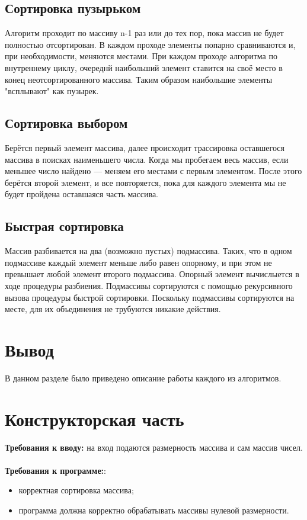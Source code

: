 \documentclass[12pt,a4paper]{article}
\numberwithin{equation}{section}
\begin{document}
\subsection{Сортировка пузырьком}
\qquad Алгоритм проходит по массиву {n-1} раз или до тех пор, пока массив не будет полностью отсортирован. 
В каждом проходе элементы попарно сравниваются и, при необходимости, меняются местами.
При каждом проходе алгоритма по внутреннему циклу, очереднй наибольший элемент ставится на своё место в конец неотсортированного массива. 
Таким образом наибольшие элементы "всплывают" как пузырек. 

\subsection{Сортировка выбором}
\qquad Берётся первый элемент массива, далее происходит трассировка оставшегося массива в поисках наименьшего числа. Когда мы пробегаем весь массив, если меньшее число найдено — меняем его местами с первым элементом. После этого берётся второй элемент, и все повторяется, пока для каждого элемента мы не будет пройдена оставшаяся часть массива.

\subsection {Быстрая сортировка}
\qquad Массив разбивается на два (возможно пустых) подмассива. Таких, что в одном подмассиве каждый элемент меньше либо равен опорному, 
и при этом не превышает любой элемент второго подмассива. Опорный элемент вычислыется в ходе процедуры разбиения. 
Подмассивы сортируются с помощью рекурсивного вызова процедуры быстрой сортировки. 
Поскольку подмассивы сортируются на месте, для их объединения не трубуются никакие действия.

\section*{Вывод}
\qquad В данном разделе было приведено описание работы каждого из алгоритмов.
\clearpage

\section{Конструкторская часть}
\textbf{Требования к вводу:} на вход подаются размерность массива и сам массив чисел.\\\\
\textbf{Требования к программе:}:\\
\begin{itemize}
\item корректная сортировка массива;
\item программа должна корректно обрабатывать массивы нулевой размерности.
\end{itemize}
\clearpage
\end{document}

